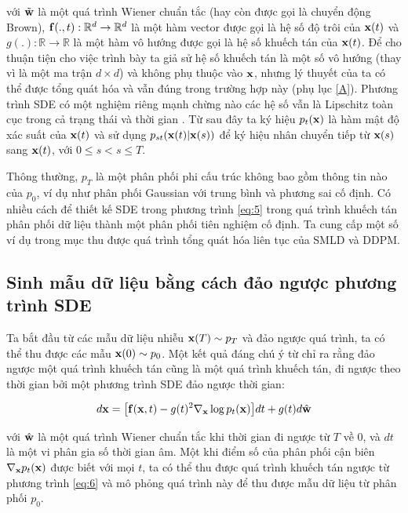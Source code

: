 \documentclass{article} %
\begin{document}
với $\tilde{\bold{w}}$ là một quá trình Wiener chuẩn tắc (hay còn được gọi là chuyển động Brown), $\bold{f}(.,t): \mathbb{R}^d \rightarrow \mathbb{R}^d$ là một hàm vector được gọi là hệ số độ trôi của $\bold{x}(t)$ và $g(.): \mathbb{R} \rightarrow \mathbb{R}$ là một hàm vô hướng được gọi là hệ số khuếch tán của $\bold{x}(t)$.
Để cho thuận tiện cho việc trình bày ta giả sử hệ số khuếch tán là một số vô hướng (thay vì là một ma trận $d \times d$) và không phụ thuộc vào $\bold{x}$, nhưng lý thuyết của ta có thể được tổng quát hóa và vẫn đúng trong trường hợp này (phụ lục \ref{A}).
Phương trình SDE có một nghiệm riêng mạnh chừng nào các hệ số vẫn là Lipschitz toàn cục trong cả trạng thái và thời gian \citep{oksendal2003stochastic}.
Từ sau đây ta ký hiệu $p_t (\bold{x})$ là hàm mật độ xác suất của $\bold{x}(t)$ và sử dụng $p_{st}(\bold{x}(t) \vert \bold{x}(s))$ để ký hiệu nhân chuyển tiếp từ $\bold{x}(s)$ sang $\bold{x}(t)$, với $0 \leq s < s \leq T$.

Thông thường, $p_T$ là một phân phối phi cấu trúc không bao gồm thông tin nào của $p_0$, ví dụ như phân phối Gaussian với trung bình và phương sai cố định.
Có nhiều cách để thiết kế SDE trong phương trình \ref{eq:5} trong quá trình khuếch tán phân phối dữ liệu thành một phân phối tiên nghiệm cố định.
Ta cung cấp một số ví dụ trong mục  thu được quá trình tổng quát hóa liên tục của SMLD và DDPM.

\subsection{Sinh mẫu dữ liệu bằng cách đảo ngược phương trình SDE}

Ta bắt đầu từ các mẫu dữ liệu nhiễu $\bold{x}(T) \sim p_T$ và đảo ngược quá trình, ta có thể thu được các mẫu $\bold{x}(0) \sim p_0$.
Một kết quả đáng chú ý từ \citep{anderson1982reverse} chỉ ra rằng đảo ngược một quá trình khuếch tán cũng là một quá trình khuếch tán, đi ngược theo thời gian bởi một phương trình SDE đảo ngược thời gian:

\begin{equation} \label{eq:6}
    d \bold{x} = \big \lbrack \bold{f}(\bold{x}, t) - g(t)^2 \nabla_{\bold{x}} \log p_t (\bold{x}) \big \rbrack dt + g(t) d \hat{\bold{w}}
\end{equation}

với $\hat{\bold{w}}$ là một quá trình Wiener chuẩn tắc khi thời gian đi ngược từ $T$ về $0$, và $dt$ là một vi phân gia số thời gian âm.
Một khi điểm số của phân phối cận biên $\nabla_{\bold{x}} p_t(\bold{x})$ được biết với mọi $t$, ta có thể thu được quá trình khuếch tán ngược từ phương trình \ref{eq:6} và mô phỏng quá trình này để thu được mẫu dữ liệu từ phân phối $p_0$.
\end{document}
